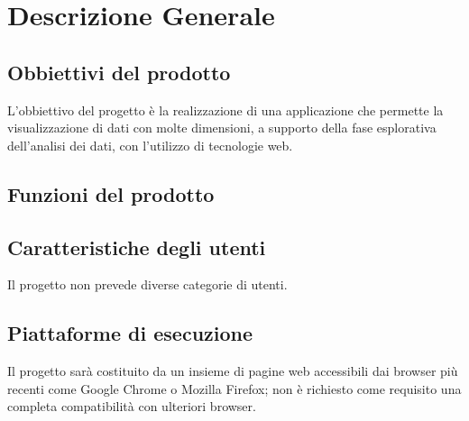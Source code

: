 \section{Descrizione Generale}
\subsection{Obbiettivi del prodotto}
L'obbiettivo del progetto è la realizzazione di una applicazione che permette la visualizzazione di dati con molte dimensioni, a supporto della fase esplorativa dell'analisi dei dati, con l'utilizzo di tecnologie web.
\subsection{Funzioni del prodotto}

\subsection{Caratteristiche degli utenti}
Il progetto non prevede diverse categorie di utenti.
\subsection{Piattaforme di esecuzione}
Il progetto sarà costituito da un insieme di pagine web accessibili dai browser più recenti come Google Chrome o Mozilla Firefox; non è richiesto come requisito una completa compatibilità con ulteriori browser.
